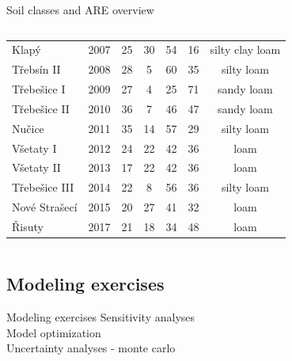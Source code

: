 \begin{block}{Soil classes and ARE overview}
\begin{columns}
\begin{column}{0.6\textwidth}
\begin{table}[]
\begin{tabular}{lcccccc}
        Klapý         & 2007    & 25                & 30             & 54            & 16            & silty clay loam \\
        Třebsín II    & 2008    & 28                & 5              & 60            & 35            & silty loam      \\
        Třebešice I   & 2009    & 27                & 4              & 25            & 71            & sandy loam      \\
        Třebešice II  & 2010    & 36                & 7              & 46            & 47            & sandy loam      \\
        Nučice        & 2011    & 35                & 14             & 57            & 29            & silty loam      \\
        Všetaty I     & 2012    & 24                & 22             & 42            & 36            & loam            \\
        Všetaty II    & 2013    & 17                & 22             & 42            & 36            & loam            \\
        Třebešice III & 2014    & 22                & 8              & 56            & 36            & silty loam      \\
        Nové Strašecí & 2015    & 20                & 27             & 41            & 32            & loam            \\
        Řisuty        & 2017    & 21                & 18             & 34            & 48            & loam           \\
        \hline
        \hline
        \end{tabular}
        \end{table}
    \end{column}
\end{columns}


\end{block}


\subsection{Modeling exercises}
\begin{block}{Modeling exercises}
Sensitivity analyses\\
Model optimization\\
Uncertainty analyses - monte carlo


\end{block}








        
